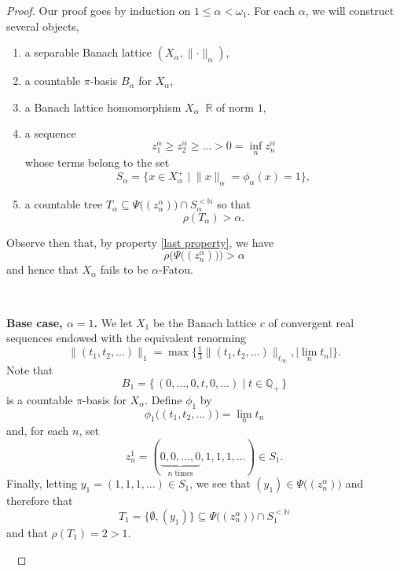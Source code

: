 \documentclass[10pt,a4paper]{amsart}
\newcommand{\Mgd}[2]{\big\{\,  {#1}\;\big|\; {#2} \,\big\} }
\newcommand {\N}{\mathbb N}
\newcommand{\Norm}[1]{\big\lVert#1\big\rVert}
\newcommand {\Q}{\mathbb Q}
\newcommand {\del}{ \; \big| \;}
\newcommand{\maps}[1]{\mathop{\overset{#1}\longrightarrow}}
\newcommand{\norm}[1]{\lVert#1\rVert}
\newcommand{\om}{\omega}
\newcommand{\tom} {\emptyset}
\begin{document}
\begin{proof}
Our proof goes by induction on $1\leqslant \alpha<\om_1$. For each $\alpha$, we will construct several objects,
\begin{enumerate}
    \item a separable Banach lattice $(X_\alpha,\norm{\cdot}_\alpha)$,
    \item a countable $\pi$-basis $B_\alpha$ for $X_\alpha$,
    \item a Banach lattice homomorphism $X_\alpha\maps{\phi_\alpha} \mathbb{R}$ of norm $1$,
    \item a sequence 
$$
z^\alpha_1\geqslant z^\alpha_2\geqslant  \ldots> 0=\inf_nz^\alpha_n
$$
whose terms belong to the set 
$$
S_\alpha=\big\{x\in X^+_\alpha\del \norm{x}_\alpha=\phi_\alpha(x)=1\big\},
$$
\item\label{last property} a countable tree $T_\alpha\subseteq \Psi\big((z^\alpha_n)\big)\cap S_\alpha^{<\N}$ so that
$$
\rho(T_\alpha)>\alpha.
$$
\end{enumerate}
Observe then that, by property \eqref{last property}, we have
$$
\rho\Big(\Psi\big((z^\alpha_n)\big)\Big)>{\alpha}
$$
and hence that $X_\alpha$ fails to be $\alpha$-Fatou.



\


{\bf Base case, $\alpha=1$.} We let $X_1$ be the Banach lattice  $c$ of convergent real sequences endowed with the equivalent renorming 
$$
\Norm{(t_1,t_2,\ldots)}_1 =\max\Big\{ \tfrac{1}{3}\Norm{(t_1,t_2,\ldots)}_{\ell_\infty},  \big|\lim_nt_n\big|\Big\}.
$$ 
Note that 
$$
B_1=\Mgd{(0,\ldots, 0,t,0,\ldots)}{t\in \Q_+}
$$
is a countable $\pi$-basis for $X_\alpha$.
Define $\phi_1$ by
$$
\phi_1\big((t_1,t_2,\ldots)\big) = \lim_n t_n
$$
and, for each $n$, set 
$$
z^1_n = (\underbrace{0,0,\ldots,0}_{n\text{ times}}, 1,1,1,\ldots) \in S_1.
$$ 
Finally, letting $y_1 = (1,1,1,\ldots)\in S_1$, we see that $(y_1)\in \Psi\big((z^\alpha_n)\big)$ and therefore that
$$
T_1=\big\{\tom, (y_1)\big\}\subseteq \Psi\big((z^\alpha_n)\big)\cap S_1^{<\N}
$$
and that $\rho(T_1)=2>1$.

\


\end{proof}
\end{document}
